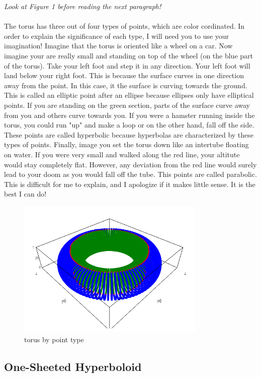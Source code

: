 \documentclass{article}
\begin{document}
\textit{Look at Figure 1 before reading the next paragraph!} \\ \\
The torus has three out of four types of points, which are color cordinated. In order to explain the significance of each type, I will need you to use your imagination! Imagine that the torus is oriented like a wheel on a car. Now imagine your are really small and standing on top of the wheel (on the blue part of the torus). Take your left foot and step it in any direction. Your left foot will land below your right foot. This is because the surface curves in one direction away from the point. In this case, it the surface is curving towards the ground. This is called an elliptic point after an ellipse because ellipses only have elliptical points. If you are standing on the green section, parts of the surface curve away from you and others curve towards you. If you were a hamster running inside the torus, you could run "up" and make a loop or on the other hand, fall off the side. These points are called hyperbolic because hyperbolas are characterized by these types of points. Finally, image you set the torus down like an intertube floating on water. If you were very small and walked along the red line, your altitute would stay completely flat. However, any deviation from the red line would surely lead to your doom as you would fall off the tube. This  points are called parabolic. This is difficult for me to explain, and I apologize if it makes little sense. It is the best I can do!



\begin{figure}[ht!]
\centering
\includegraphics[width=90mm]{torus.png}
\caption{torus by point type}
\label{}
\end{figure}

\subsection{One-Sheeted Hyperboloid}
\end{document}
